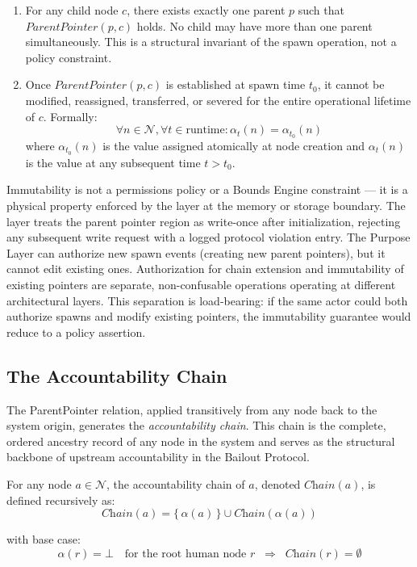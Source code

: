 \begin{enumerate}
\item[\textbf{P1 — Uniqueness:}] For any child node $c$, there exists exactly one parent $p$ such that $\textit{ParentPointer}(p, c)$ holds. No child may have more than one parent simultaneously. This is a structural invariant of the spawn operation, not a policy constraint.

\item[\textbf{P2 — Immutability:}] Once $\textit{ParentPointer}(p, c)$ is established at spawn time $t_0$, it cannot be modified, reassigned, transferred, or severed for the entire operational lifetime of $c$. Formally:
\begin{equation}
\forall n \in \mathcal{N}, \forall t \in \text{runtime}: \alpha_t(n) = \alpha_{t_0}(n)
\tag{PP-2}
\end{equation}
where $\alpha_{t_0}(n)$ is the value assigned atomically at node creation and $\alpha_t(n)$ is the value at any subsequent time $t > t_0$.
\end{enumerate}

Immutability is not a permissions policy or a Bounds Engine constraint — it is a physical property enforced by the \fact{} layer at the memory or storage boundary. The \fact{} layer treats the parent pointer region as write-once after initialization, rejecting any subsequent write request with a logged protocol violation entry. The Purpose Layer can authorize new spawn events (creating new parent pointers), but it cannot edit existing ones. Authorization for chain extension and immutability of existing pointers are separate, non-confusable operations operating at different architectural layers. This separation is load-bearing: if the same actor could both authorize spawns and modify existing pointers, the immutability guarantee would reduce to a policy assertion.

\subsection{The Accountability Chain}

The ParentPointer relation, applied transitively from any node back to the system origin, generates the \emph{accountability chain}. This chain is the complete, ordered ancestry record of any node in the system and serves as the structural backbone of upstream accountability in the Bailout Protocol.

\begin{definition}
\label{def:chain}
For any node $a \in \mathcal{N}$, the accountability chain of $a$, denoted $\textit{Chain}(a)$, is defined recursively as:
\begin{equation}
\textit{Chain}(a) = \{\,\alpha(a)\,\} \cup \textit{Chain}(\alpha(a))
\tag{CH-1}
\end{equation}

\noindent with base case:
\begin{equation}
\alpha(r) = \bot \quad \text{for the root human node } r \;\;\Rightarrow\;\; \textit{Chain}(r) = \emptyset
\tag{CH-2}
\end{equation}
\end{definition}

